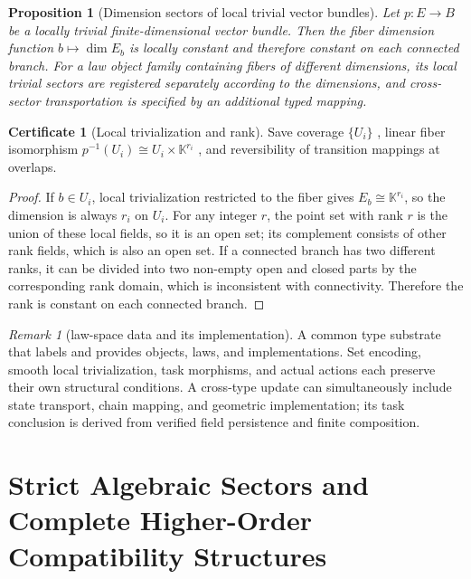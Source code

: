 \documentclass[12pt,a4paper,openany,notitlepage]{report}
\theoremstyle{plain}
\newtheorem{proposition}[theorem]{Proposition}
\theoremstyle{definition}
\newtheorem*{certificate}{Certificate}
\theoremstyle{remark}
\newtheorem{remark}[theorem]{Remark}
\begin{document}
\begin{CJK*}
\begin{proposition}
[Dimension sectors of local trivial vector bundles]\label{exp:law:rank-sector}
Let $p:E\to B$ be a locally trivial finite-dimensional vector bundle. Then the fiber dimension function $b\mapsto\dim E_b$ is locally constant and therefore constant on each connected branch. For a law object family containing fibers of different dimensions, its local trivial sectors are registered separately according to the dimensions, and cross-sector transportation is specified by an additional typed mapping.\end{proposition}
\begin{certificate}
[Local trivialization and rank]Save coverage $\{U_i\}$ , linear fiber isomorphism $p^{-1}(U_i)\cong U_i\times\mathbb K^{r_i}$ , and reversibility of transition mappings at overlaps.\end{certificate}
\begin{proof}
If $b\in U_i$, local trivialization restricted to the fiber gives $E_b\cong\mathbb K^{r_i}$, so the dimension is always $r_i$ on $U_i$. For any integer $r$, the point set with rank $r$ is the union of these local fields, so it is an open set; its complement consists of other rank fields, which is also an open set. If a connected branch has two different ranks, it can be divided into two non-empty open and closed parts by the corresponding rank domain, which is inconsistent with connectivity. Therefore the rank is constant on each connected branch.\end{proof}


\begin{remark}
[law-space data and its implementation]A common type substrate that labels and provides objects, laws, and implementations. Set encoding, smooth local trivialization, task morphisms, and actual actions each preserve their own structural conditions. A cross-type update can simultaneously include state transport, chain mapping, and geometric implementation; its task conclusion is derived from verified field persistence and finite composition.\end{remark}


\chapter{Strict Algebraic Sectors and Complete Higher-Order Compatibility Structures}
\label{exp:ch:higher}



\end{CJK*}
\end{document}
